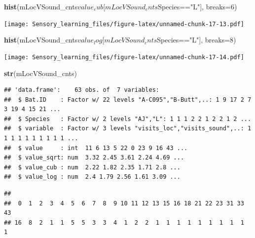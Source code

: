 \documentclass[]{article}
\newenvironment{Shaded}{\begin{snugshade}}{\end{snugshade}}
\newcommand{\KeywordTok}[1]{\textcolor[rgb]{0.13,0.29,0.53}{\textbf{{#1}}}}
\newcommand{\DataTypeTok}[1]{\textcolor[rgb]{0.13,0.29,0.53}{{#1}}}
\newcommand{\DecValTok}[1]{\textcolor[rgb]{0.00,0.00,0.81}{{#1}}}
\newcommand{\StringTok}[1]{\textcolor[rgb]{0.31,0.60,0.02}{{#1}}}
\newcommand{\NormalTok}[1]{{#1}}
\begin{document}
\begin{Shaded}
\begin{Highlighting}[]
\KeywordTok{hist}\NormalTok{(mLocVSound_cnts$value_cub[mLocVSound_cnts$Species==}\StringTok{"L"}\NormalTok{], }\DataTypeTok{breaks=}\DecValTok{6}\NormalTok{)}
\end{Highlighting}
\end{Shaded}

\texttt{[image: Sensory\_learning\_files/figure-latex/unnamed-chunk-17-13.pdf]}

\begin{Shaded}
\begin{Highlighting}[]
\KeywordTok{hist}\NormalTok{(mLocVSound_cnts$value_log[mLocVSound_cnts$Species==}\StringTok{"L"}\NormalTok{], }\DataTypeTok{breaks=}\DecValTok{8}\NormalTok{)}
\end{Highlighting}
\end{Shaded}

\texttt{[image: Sensory\_learning\_files/figure-latex/unnamed-chunk-17-14.pdf]}

\begin{Shaded}
\begin{Highlighting}[]
\KeywordTok{str}\NormalTok{(mLocVSound_cnts)}
\end{Highlighting}
\end{Shaded}

\begin{verbatim}
## 'data.frame':    63 obs. of  7 variables:
##  $ Bat.ID    : Factor w/ 22 levels "A-C095","B-Butt",..: 1 9 17 2 7 3 19 4 15 21 ...
##  $ Species   : Factor w/ 2 levels "AJ","L": 1 1 1 2 2 1 2 2 1 2 ...
##  $ variable  : Factor w/ 3 levels "visits_loc","visits_sound",..: 1 1 1 1 1 1 1 1 1 1 ...
##  $ value     : int  11 6 13 5 22 0 23 9 16 43 ...
##  $ value_sqrt: num  3.32 2.45 3.61 2.24 4.69 ...
##  $ value_cub : num  2.22 1.82 2.35 1.71 2.8 ...
##  $ value_log : num  2.4 1.79 2.56 1.61 3.09 ...
\end{verbatim}

\begin{Shaded}
\end{Shaded}

\begin{verbatim}
## 
##  0  1  2  3  4  5  6  7  8  9 10 11 12 13 15 16 18 21 22 23 31 33 43 
## 16  8  2  1  1  5  5  3  3  4  1  2  2  1  1  1  1  1  1  1  1  1  1
\end{verbatim}
\end{document}
